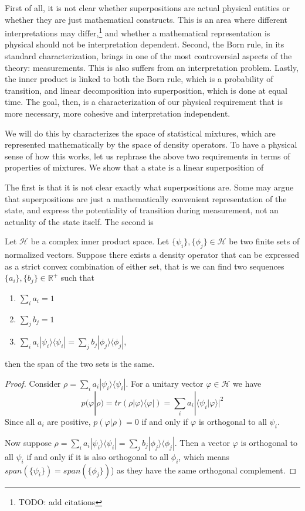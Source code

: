 \documentclass[10pt,twocolumn, nofootinbib]{revtex4-2}
\def\>{\rangle}
\def\<{\langle}
\begin{document}
First of all, it is not clear whether superpositions are actual physical entities or whether they are just mathematical constructs. This is an area where different interpretations may differ,\footnote{TODO: add citations} and whether a mathematical representation is physical should not be interpretation dependent. Second, the Born rule, in its standard characterization, brings in one of the most controversial aspects of the theory: measurements. This is also suffers from an interpretation problem. Lastly, the inner product is linked to both the Born rule, which is a probability of transition, and linear decomposition into superposition, which is done at equal time. The goal, then, is a characterization of our physical requirement that is more necessary, more cohesive and interpretation independent.

We will do this by characterizes the space of statistical mixtures, which are represented mathematically by the space of density operators. To have a physical sense of how this works, let us rephrase the above two requirements in terms of properties of mixtures. We show that a state is a linear superposition of 

The first is that it is not clear exactly what superpositions are. Some may argue that superpositions are just a mathematically convenient representation of the state, and express the potentiality of transition during measurement, not an actuality of the state itself. The second is 

\begin{prop}\label{prop_densitySpan}
	Let $\mathcal{H}$ be a complex inner product space. Let $\{\psi_i\}, \{\phi_j\} \in \mathcal{H}$ be two finite sets of normalized vectors. Suppose there exists a density operator that can be expressed as a strict convex combination of either set, that is we can find two sequences $\{a_i\}, \{b_j\} \in \mathbb{R}^+$ such that
	\begin{enumerate}
		\item $\sum_i a_i = 1$
		\item $\sum_j b_j = 1$
		\item $\sum_i a_i |\psi_i\>\<\psi_i| = \sum_j b_j |\phi_j\>\<\phi_j|$,
	\end{enumerate}
	then the span of the two sets is the same.
\end{prop}

\begin{proof}
	Consider $\rho = \sum_i a_i |\psi_i\>\<\psi_i|$. For a unitary vector $\varphi \in \mathcal{H}$ we have
	$$p(\varphi|\rho)=tr(\rho |\varphi\>\<\varphi|) =  \sum_i a_i |\<\psi_i|\varphi\>|^2$$
	Since all $a_i$ are positive, $p(\varphi|\rho) = 0$ if and only if $\varphi$ is orthogonal to all $\psi_i$.
	
	Now suppose $\rho = \sum_i a_i |\psi_i\>\<\psi_i| = \sum_j b_j |\phi_j\>\<\phi_j|$. Then a vector $\varphi$ is orthogonal to all $\psi_i$ if and only if it is also orthogonal to all $\phi_i$, which means $span(\{\psi_i\}) = span(\{\phi_j\})$) as they have the same orthogonal complement.
\end{proof}
\end{document}
